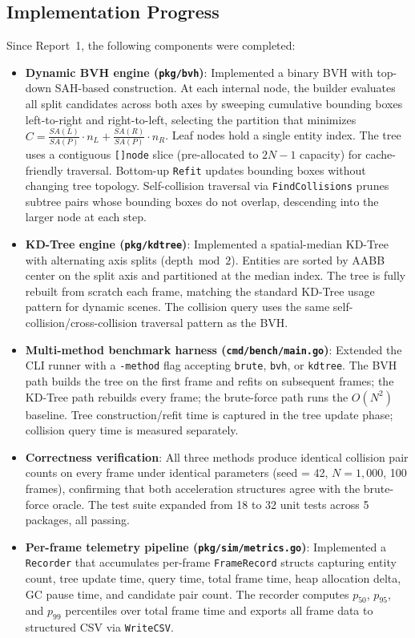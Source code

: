 \documentclass[12pt]{article}
\begin{document}
\subsection{Implementation Progress}

Since Report~1, the following components were completed:

\begin{itemize}
    \item \textbf{Dynamic BVH engine (\texttt{pkg/bvh})}: Implemented a binary BVH with top-down SAH-based construction. At each internal node, the builder evaluates all split candidates across both axes by sweeping cumulative bounding boxes left-to-right and right-to-left, selecting the partition that minimizes $C = \frac{SA(L)}{SA(P)} \cdot n_L + \frac{SA(R)}{SA(P)} \cdot n_R$. Leaf nodes hold a single entity index. The tree uses a contiguous \texttt{[]node} slice (pre-allocated to $2N - 1$ capacity) for cache-friendly traversal. Bottom-up \texttt{Refit} updates bounding boxes without changing tree topology. Self-collision traversal via \texttt{FindCollisions} prunes subtree pairs whose bounding boxes do not overlap, descending into the larger node at each step.

    \item \textbf{KD-Tree engine (\texttt{pkg/kdtree})}: Implemented a spatial-median KD-Tree with alternating axis splits ($\text{depth} \bmod 2$). Entities are sorted by AABB center on the split axis and partitioned at the median index. The tree is fully rebuilt from scratch each frame, matching the standard KD-Tree usage pattern for dynamic scenes. The collision query uses the same self-collision/cross-collision traversal pattern as the BVH.

    \item \textbf{Multi-method benchmark harness (\texttt{cmd/bench/main.go})}: Extended the CLI runner with a \texttt{-method} flag accepting \texttt{brute}, \texttt{bvh}, or \texttt{kdtree}. The BVH path builds the tree on the first frame and refits on subsequent frames; the KD-Tree path rebuilds every frame; the brute-force path runs the $O(N^2)$ baseline. Tree construction/refit time is captured in the tree update phase; collision query time is measured separately.

    \item \textbf{Correctness verification}: All three methods produce identical collision pair counts on every frame under identical parameters (seed = 42, $N = 1{,}000$, 100 frames), confirming that both acceleration structures agree with the brute-force oracle. The test suite expanded from 18 to 32 unit tests across 5 packages, all passing.

    \item \textbf{Per-frame telemetry pipeline (\texttt{pkg/sim/metrics.go})}: Implemented a \texttt{Recorder} that accumulates per-frame \texttt{FrameRecord} structs capturing entity count, tree update time, query time, total frame time, heap allocation delta, GC pause time, and candidate pair count. The recorder computes $p_{50}$, $p_{95}$, and $p_{99}$ percentiles over total frame time and exports all frame data to structured CSV via \texttt{WriteCSV}.
\end{itemize}
\end{document}
